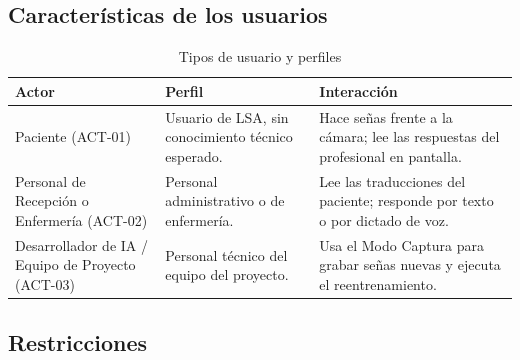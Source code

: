 \subsection{Características de los usuarios}

\begin{table}[H]
    \centering
    \caption{Tipos de usuario y perfiles}
    \label{tab:usuarios}
    \small
    \begin{tabularx}{\textwidth}{>{\raggedright\arraybackslash}p{3.6cm} >{\raggedright\arraybackslash}p{4.1cm} X}
        \toprule
        \textbf{Actor} & \textbf{Perfil} & \textbf{Interacción} \\
        \midrule
        Paciente (ACT-01) & Usuario de LSA, sin conocimiento técnico esperado. & Hace señas frente a la cámara; lee las respuestas del profesional en pantalla. \\
        Personal de Recepción o Enfermería (ACT-02) & Personal administrativo o de enfermería. & Lee las traducciones del paciente; responde por texto o por dictado de voz. \\
        Desarrollador de IA / Equipo de Proyecto (ACT-03) & Personal técnico del equipo del proyecto. & Usa el Modo Captura para grabar señas nuevas y ejecuta el reentrenamiento. \\
        \bottomrule
    \end{tabularx}
\end{table}

\subsection{Restricciones}

